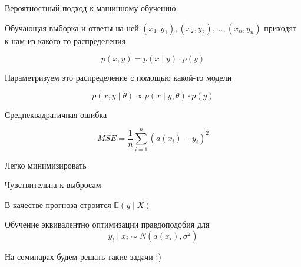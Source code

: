 \documentclass[notes,12pt, aspectratio=169]{beamer}
\newenvironment{wideitemize}{\itemize\addtolength{\itemsep}{10pt}}{\enditemize}
\begin{document}
\begin{frame}{Вероятностный подход к машинному обучению}
	\begin{wideitemize}
		\item  Обучающая выборка и ответы на ней $(x_1, y_1), (x_2, y_2), \ldots, (x_n, y_n)$ приходят к нам из какого-то распределения
		
		\[
		p(x, y) = p(x \mid y) \cdot p(y)
		\]
		
		\pause
		
		\item Параметризуем это распределение с помощью какой-то модели
		
		\[
		p(x, y \mid \theta) \propto p(x \mid y, \theta) \cdot p(y)
		\]
		
		
	
		
	\end{wideitemize}
\end{frame} 


\begin{frame}{Среднеквадратичная ошибка}
	
	\[
	MSE = \frac{1}{n} \sum_{i=1}^n (a(x_i) - y_i)^2
	\]
	
	\begin{wideitemize}
		
		\item  Легко минимизировать
		
		\item  Чувствительна к выбросам 
		
		\item  В качестве прогноза строится $\mathbb{E}(y \mid X)$
		
		\item  Обучение эквивалентно оптимизации правдоподобия для  \[ y_i \mid x_i \sim N(a(x_i), \sigma^2 ) \]
		
		\item На семинарах будем решать такие задачи :) 
		
	\end{wideitemize}
\end{frame}
\end{document}
